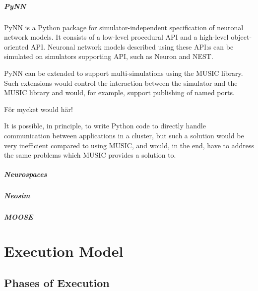 \documentclass[a4paper]{report}
\begin{document}
\paragraph{PyNN}

PyNN is a Python package for simulator-independent specification of
neuronal network models.  It consists of a low-level procedural API
and a high-level object-oriented API.  Neuronal network models
described using these API:s can be simulated on simulators supporting
API, such as Neuron and NEST.

PyNN can be extended to support multi-simulations using the MUSIC
library.  Such extensions would control the interaction between the
simulator and the MUSIC library and would, for example, support
publishing of named ports.

\begin{metatext}
  För mycket would här!
\end{metatext}

It is possible, in principle, to write Python code to directly handle
communication between applications in a cluster, but such a solution
would be very inefficient compared to using MUSIC, and would, in the
end, have to address the same problems which MUSIC provides a solution
to.

\paragraph{Neurospaces}

\paragraph{Neosim}

\paragraph{MOOSE}

\chapter{Execution Model}

\section{Phases of Execution}
\end{document}
